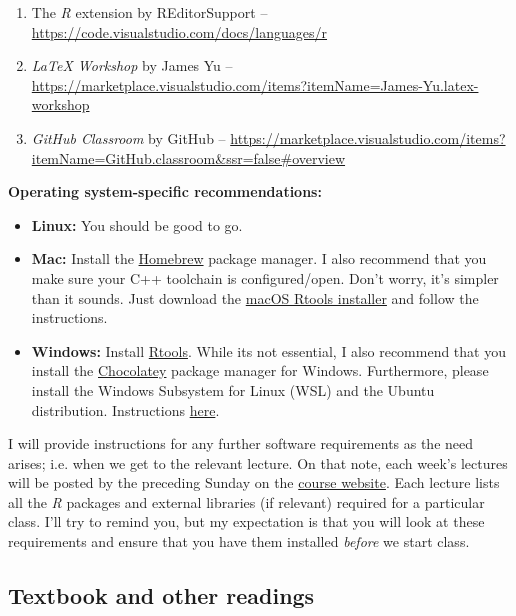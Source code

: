 \documentclass[11pt]{article}
\begin{document}
\begin{enumerate}
  \item The \textit{R} extension by REditorSupport -- \url{https://code.visualstudio.com/docs/languages/r}
  \item \textit{LaTeX Workshop} by James Yu -- \url{https://marketplace.visualstudio.com/items?itemName=James-Yu.latex-workshop}
  \item \textit{GitHub Classroom} by GitHub -- \url{https://marketplace.visualstudio.com/items?itemName=GitHub.classroom&ssr=false#overview}
\end{enumerate}

\textbf{Operating system-specific recommendations:}

\begin{itemize}
	\item \textbf{Linux:} You should be good to go. 
	\item \textbf{Mac:} Install the \href{https://brew.sh/}{Homebrew} package manager. I also recommend that you make sure your C++ toolchain is configured/open. Don't worry, it's simpler than it sounds. Just download the \href{https://github.com/rmacoslib/r-macos-rtools#installer-package-for-macos-r-toolchain-}{macOS Rtools installer} and follow the instructions.
	\item \textbf{Windows:} Install \href{https://cran.r-project.org/bin/windows/Rtools/}{Rtools}. While its not essential, I also recommend that you install the \href{https://chocolatey.org/}{Chocolatey} package manager for Windows. Furthermore, please install the Windows Subsystem for Linux (WSL) and the Ubuntu distribution. Instructions \href{https://docs.microsoft.com/en-us/windows/wsl/install-win10}{here}.
\end{itemize}

I will provide instructions for any further software requirements as the need arises; i.e. when we get to the relevant lecture. On that note, each week's lectures will be posted by the preceding Sunday on the \href{https://github.com/ECON368-fall2023-big-data-and-economics}{course website}. Each lecture lists all the \textit{R} packages and external libraries (if relevant) required for a particular class. I'll try to remind you, but my expectation is that you will look at these requirements and ensure that you have them installed \textit{before} we start class. 

\subsection*{Textbook and other readings}
\end{document}
